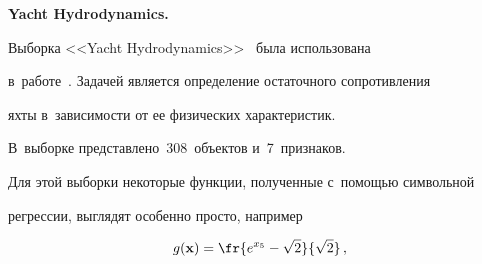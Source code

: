 






\textbf{Yacht Hydrodynamics.}

Выборка <<Yacht Hydrodynamics>>~\cite{uci_yacht} была использована 

в~работе~\cite{yacht}. Задачей является определение остаточного сопротивления 

яхты в~зависимости от ее физических характеристик.



В~выборке пред\-став\-ле\-но~308~объектов и~7~признаков.

Для этой выборки некоторые функции, полученные с~помощью символьной 

регрессии, выглядят особенно просто, например

\begin{equation*}

g(\mathbf{x}) = \fr{e^{x_5} - \sqrt{2}}{\sqrt{2}}\,,

\end{equation*}



\vspace*{-12pt}





\pagebreak



